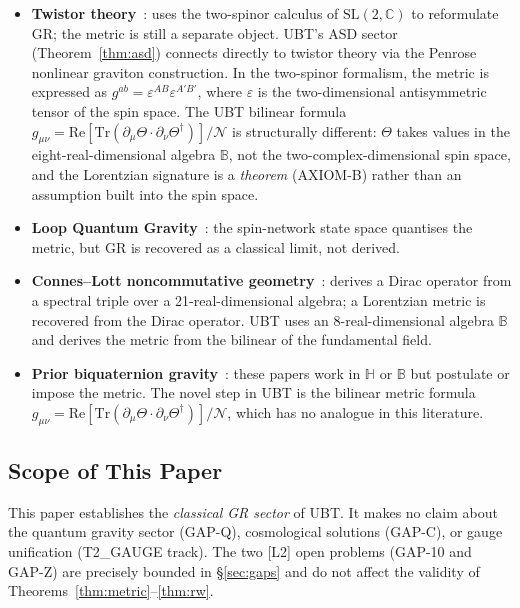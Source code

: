 \documentclass[12pt,a4paper]{article}
\theoremstyle{definition}
\theoremstyle{remark}
\newcommand{\BB}{\mathbb{B}}
\newcommand{\CC}{\mathbb{C}}
\newcommand{\HH}{\mathbb{H}}
\newcommand{\Tr}{\mathrm{Tr}}
\newcommand{\re}{\mathrm{Re}}
\newcommand{\calN}{\mathcal{N}}
\begin{document}
\begin{itemize}
  \item \textbf{Twistor theory}~\cite{penrose1976,penrose_rindler1984}:
        uses the two-spinor calculus of $\mathrm{SL}(2,\CC)$ to reformulate
        GR; the metric is still a separate object.
        UBT's ASD sector (Theorem~\ref{thm:asd}) connects directly to twistor
        theory via the Penrose nonlinear graviton construction.
        In the two-spinor formalism, the metric is expressed as
        $g^{ab} = \varepsilon^{AB}\varepsilon^{A'B'}$, where $\varepsilon$ is
        the two-dimensional antisymmetric tensor of the spin space.
        The UBT bilinear formula
        $g_{\mu\nu} = \re[\Tr(\partial_\mu\Theta \cdot \partial_\nu\Theta^\dagger)]/\calN$
        is structurally different: $\Theta$ takes values in the eight-real-dimensional
        algebra $\BB$, not the two-complex-dimensional spin space, and the Lorentzian
        signature is a \emph{theorem} (AXIOM-B) rather than an assumption built into
        the spin space.

  \item \textbf{Loop Quantum Gravity}~\cite{thiemann2007}:
        the spin-network state space quantises the metric, but GR is
        recovered as a classical limit, not derived.

  \item \textbf{Connes--Lott noncommutative geometry}~\cite{connes1991}:
        derives a Dirac operator from a spectral triple over a
        21-real-dimensional algebra; a Lorentzian metric is recovered
        from the Dirac operator.
        UBT uses an 8-real-dimensional algebra $\BB$ and derives the
        metric from the bilinear of the fundamental field.

  \item \textbf{Prior biquaternion gravity}~\cite{adler1995,finkelstein1962,deleo1996}:
        these papers work in $\HH$ or $\BB$ but postulate or impose the
        metric.
        The novel step in UBT is the bilinear metric formula
        $g_{\mu\nu} = \re[\Tr(\partial_\mu\Theta \cdot \partial_\nu\Theta^\dagger)]/\calN$,
        which has no analogue in this literature.
\end{itemize}

\subsection{Scope of This Paper}

This paper establishes the \emph{classical GR sector} of UBT.
It makes no claim about the quantum gravity sector (GAP-Q),
cosmological solutions (GAP-C), or gauge unification (T2\_GAUGE track).
The two [L2] open problems (GAP-10 and GAP-Z) are precisely bounded in
\S\ref{sec:gaps} and do not affect the validity of Theorems~\ref{thm:metric}--\ref{thm:rw}.
\end{document}
